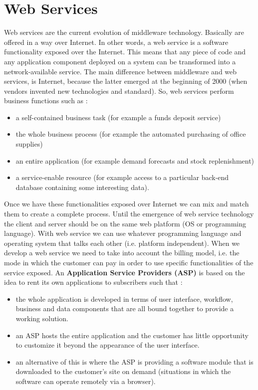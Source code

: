 \documentclass[11pt]{article}
\begin{document}
\section{Web Services}
Web services are the current evolution of middleware technology. Basically are offered in a way over Internet. In other words, a web service is a software functionality exposed over the Internet. This means that any piece of code and any application component deployed on a system can be transformed into a network-available service. The main difference between middleware and web services, is Internet, because the latter emerged at the beginning of 2000 (when vendors invented new technologies and standard). So, web services perform business functions such as :
\begin{itemize}
\item a self-contained business task (for example a funds deposit service)
\item the whole business process (for example the automated purchasing of office supplies)
\item an entire application (for example demand forecasts and stock replenishment)
\item a service-enable resource (for example access to a particular back-end database containing some interesting data).
\end{itemize}
Once we have these functionalities exposed over Internet we can mix and match them to create a complete process. Until the emergence of web service technology the client and server should be on the same web platform (OS or programming language). With web service we can use whatever programming language and operating system that talks each other (i.e. platform independent). When we develop a web service we need to take into account the billing model, i.e. the mode in which the customer can pay in order to use specific functionalities of the service exposed. An \textbf{Application Service Providers (ASP)} is based on the idea to rent its own applications to subscribers such that :
\begin{itemize}
\item the whole application is developed in terms of user interface, workflow, business and data components that are all bound together to provide a working solution.
\item an ASP hosts the entire application and the customer has little opportunity to customize it beyond the appearance of the user interface.
\item an alternative of this is where the ASP is providing a software module that is downloaded to the customer's site on demand (situations in which the software can operate remotely via a browser).
\end{itemize}
\end{document}
